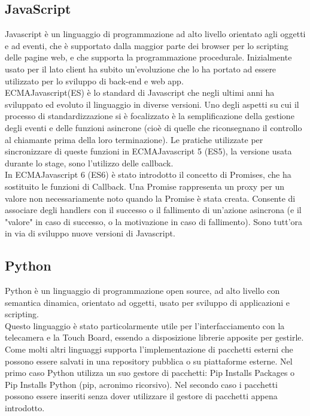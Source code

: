 \subsection{JavaScript}
Javascript \`e un linguaggio di programmazione ad alto livello orientato agli oggetti e ad eventi, che \`e supportato dalla maggior parte dei browser
per lo scripting delle pagine web, e che supporta la programmazione procedurale.
Inizialmente usato per il lato client ha subito un'evoluzione che lo ha portato ad essere utilizzato per lo sviluppo di back-end e web app.
\\[2\baselineskip]
ECMAJavascript(ES) \`e lo standard di Javascript che negli ultimi anni ha sviluppato ed evoluto il linguaggio in diverse versioni.
Uno degli aspetti su cui il processo di standardizzazione si è focalizzato \`e la semplificazione della gestione degli eventi e delle funzioni asincrone
(cio\`e di quelle che riconsegnano il controllo al chiamante prima della loro terminazione).
Le pratiche utilizzate per sincronizzare di queste funzioni in ECMAJavascript 5 (ES5), la versione usata durante lo
stage, sono l'utilizzo delle callback.\\[1\baselineskip]
In ECMAJavascript 6 (ES6) \`e stato introdotto il concetto di Promises, che ha sostituito le funzioni di Callback.
Una Promise rappresenta un proxy per un valore non necessariamente noto quando la Promise è stata creata. Consente di associare degli handlers
con il successo o il fallimento di un'azione asincrona (e il "valore" in caso di successo, o la motivazione in caso di fallimento).
Sono tutt'ora in via di sviluppo nuove versioni di Javascript.

\subsection{Python}\label{cap:python}
Python \`e un linguaggio di programmazione open source, ad alto livello con semantica dinamica, orientato ad oggetti, usato
per sviluppo di applicazioni e scripting.\\[1\baselineskip]
Questo linguaggio \`e stato particolarmente utile per l'interfacciamento con la telecamera e la Touch Board, essendo a disposizione librerie
apposite per gestirle.\\
Come molti altri linguaggi supporta l'implementazione di pacchetti esterni che possono essere salvati in una repository pubblica
o su piattaforme esterne.
Nel primo caso Python utilizza un suo gestore di pacchetti: Pip Installs Packages o Pip Installs Python (pip, acronimo ricorsivo).
Nel secondo caso i pacchetti possono essere inseriti senza dover utilizzare il gestore di pacchetti appena introdotto.
\\[2\baselineskip]

